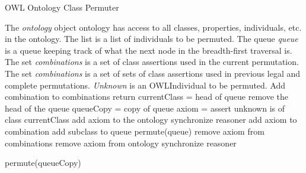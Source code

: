 \documentclass{article}
\begin{document}
  \begin{algorithm}
\caption{OWL Ontology Class Permuter}
\begin{algorithmic}[0]
\State The \emph{ontology} object ontology has access to all classes, properties, individuals, etc.
in the ontology. The list  is a list of individuals to be permuted.
The queue \emph{queue }is a queue keeping track of what the next node in the
breadth-first traversal is. The set \emph{combinations} is a set of class assertions
used in the current permutation. The set \emph{combinations} is a set of sets of class
assertions used in  previous legal and complete permutations. \emph{Unknown} is an
OWLIndividual to be permuted.
\State
\State
      \State Add combination to combinations
    \EndIf
    \State return
  \EndIf
  \State
  \State currentClass = head of queue
  \State remove the head of the queue
  \State queueCopy = copy of queue
  \State axiom = assert unknown is of class currentClass
  \State
    \State add axiom to the ontology
    \State synchronize reasoner
    \State
      \State add axiom to combination
      \State
          \State add subclass to queue
        \EndIf
      \EndFor
      \State
      \State permute(queue)
      \State remove axiom from combinations
    \EndIf
  \State remove axiom from ontology
  \State synchronize reasoner
  \EndIf

  \State permute(queueCopy)

\EndProcedure
\end{algorithmic}
\end{algorithm}
\end{document}
